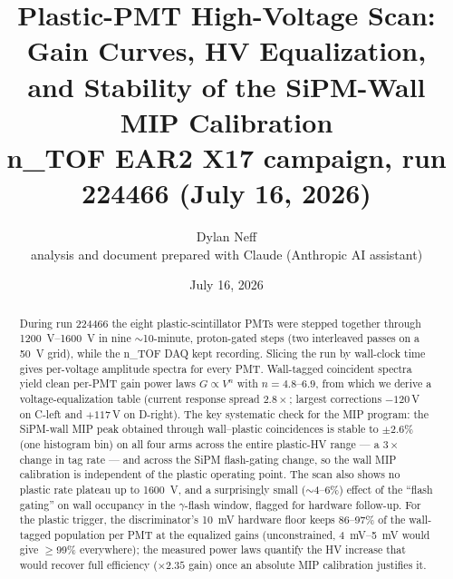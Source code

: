 \documentclass[11pt]{article}
\title{Plastic-PMT High-Voltage Scan: Gain Curves, HV Equalization,\\
       and Stability of the SiPM-Wall MIP Calibration\\
       \large n\_TOF EAR2 X17 campaign, run 224466 (July 16, 2026)}
\author{Dylan Neff \\[0.5ex] {\small analysis and document prepared with Claude (Anthropic AI assistant)}}
\date{July 16, 2026}
\begin{document}
\maketitle

\begin{abstract}
During run 224466 the eight plastic-scintillator PMTs were stepped together
through \SIrange{1200}{1600}{\volt} in nine $\sim$10-minute, proton-gated steps
(two interleaved passes on a \SI{50}{\volt} grid), while the n\_TOF DAQ kept
recording. Slicing the run by wall-clock time gives per-voltage amplitude
spectra for every PMT. Wall-tagged coincident spectra yield clean per-PMT gain
power laws $G\propto V^{n}$ with $n=4.8$--$6.9$, from which we derive a
voltage-equalization table (current response spread $2.8\times$;
largest corrections $-120$\,V on C-left and $+117$\,V on D-right). The key
systematic check for the MIP program: the SiPM-wall MIP peak obtained through
wall--plastic coincidences is stable to $\pm2.6\%$ (one histogram bin) on all
four arms across the entire plastic-HV range --- a $3\times$ change in tag rate
--- and across the SiPM flash-gating change, so the wall MIP calibration is
independent of the plastic operating point. The scan also shows no
plastic rate plateau up to \SI{1600}{\volt}, and a surprisingly small
($\sim$4--6\%) effect of the ``flash gating'' on wall occupancy in the
$\gamma$-flash window, flagged for hardware follow-up. For the plastic trigger, the discriminator's \SI{10}{\milli\volt} hardware
floor keeps 86--97\% of the wall-tagged population per PMT at the equalized
gains (unconstrained, \SIrange{4}{5}{\milli\volt} would give $\geq$99\%
everywhere); the measured power laws quantify the HV increase that would
recover full efficiency ($\times2.35$ gain) once an absolute MIP calibration
justifies it.
\end{abstract}
\end{document}
